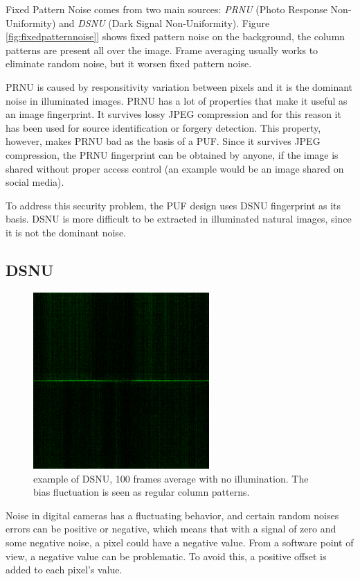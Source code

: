 Fixed Pattern Noise comes from two main sources: \textit{PRNU} (Photo Response Non-Uniformity) and \textit{DSNU} (Dark Signal Non-Uniformity).
Figure \ref{fig:fixedpatternnoise}] shows fixed pattern noise on the background, the column patterns are present all over the image. Frame averaging usually works to eliminate random noise, but it worsen fixed pattern noise.

PRNU is caused by responsitivity variation between pixels and it is the dominant noise in illuminated images. PRNU has a lot of properties that make it useful as an image fingerprint.
It survives lossy JPEG compression and for this reason it has been used for source identification or forgery detection. This property, however, makes PRNU bad as the basis of a PUF.
Since it survives JPEG compression, the PRNU fingerprint can be obtained by anyone, if the image is shared without proper access control (an example would be an image shared on social media).

To address this security problem, the PUF design uses DSNU fingerprint as its basis. DSNU is more difficult to be extracted in illuminated natural images, since it is not the dominant noise.

\subsection{DSNU}
\begin{figure}[h!]                      
    \centering
    \includegraphics[width=0.6\textwidth]{images/DSNU.png}
    \caption{example of DSNU, 100 frames average with no illumination. The bias fluctuation is seen as regular column patterns. \cite{pattnoise}}
    \label{fig:dsnu}
\end{figure}

Noise in digital cameras has a fluctuating behavior, and certain random noises errors can be positive or negative, which means that with a signal of zero and some negative noise, a pixel could have a negative value.
From a software point of view, a negative value can be problematic. To avoid this, a positive offset is added to each pixel's value.

